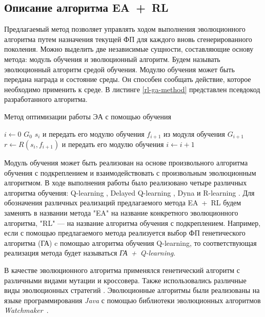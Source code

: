 \subsection{Описание алгоритма EA~+~RL}

Предлагаемый метод позволяет управлять ходом выполнения эволюционного алгоритма путем назначения текущей ФП для каждого вновь сгенерированного поколения. Можно выделить две независимые сущности, составляющие основу метода: модуль обучения и эволюционный алгоритм. Будем называть эволюционный алгоритм средой обучения. Модулю обучения может быть передана награда и состояние среды. Он способен сообщать действие, которое необходимо применить к среде. В листинге \ref{rl-ga-method} представлен псевдокод разработанного алгоритма.
\begin{algorithm}[h!]
\caption{Метод оптимизации работы ЭА с помощью обучения}
\label{rl-ga-method}
\begin{algorithmic}[1]
   $i \gets 0$
   $G_0$
     $s_i$ {и передать его модулю обучения}
     $f_{i+1}$ { из модуля обучения}
     $G_{i+1}$
     $r \gets R(s_i, f_{i+1})$ { и передать его модулю обучения}
     $i \gets i+1$
  \ENDWHILE
\end{algorithmic}
\end{algorithm}
Модуль обучения может быть реализован на основе произвольного алгоритма обучения с подкреплением и взаимодействовать с произвольным эволюционным алгоритмом. В ходе выполнения работы было реализовано четыре различных алгоритма обучения: Q-learning \cite{sutton}, Delayed Q-learning \cite{delayed}, Dyna \cite{systems, survey} и R-learning \cite{r-learning}. Для обозначения различных реализаций предлагаемого метода EA~+~RL будем заменять в названии метода "EA" на название конкретного эволюционного алгоритма, "RL" --- на название алгоритма обучения с подкреплением. Например, если с помощью предлагаемого метода реализуется выбор ФП генетического алгоритма (ГА) c помощью алгоритма обучения Q-learning, то соответствующая реализация метода будет называться \emph{ГА~+~Q-learning}.

В качестве эволюционного алгоритма применялся генетический алгоритм \cite{mitchell-ga} с различными видами мутации и кроссовера. Также использовались различные виды эволюционных стратегий \cite{nature-inspired}. Эволюционные алгоритмы были реализованы на языке программирования \emph{Java} с помощью библиотеки эволюционных алгоритмов \emph{Watchmaker}~\cite{watchmaker}.


